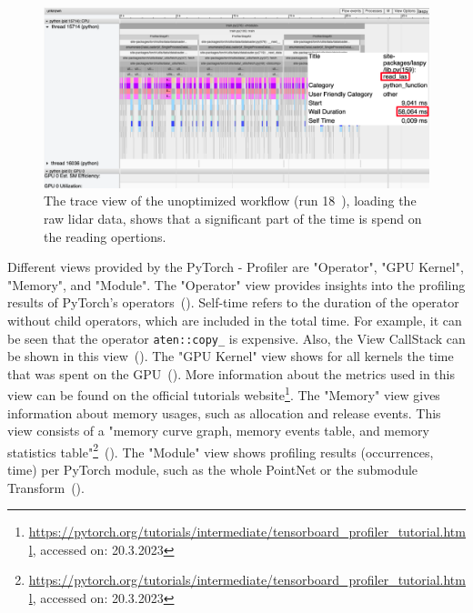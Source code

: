 \documentclass[12pt, a4paper, hidelinks]{article}
\begin{document}
\begin{figure}[H]
\centering
\includegraphics[width=1\textwidth]{./assets/scap_gtx1080_profiler-torch_sample-points_14650750_trace-view-laspy}
\caption[PyTorch - Profiler: Trace View of data input for run 18]{The trace view of the unoptimized workflow (run 18~), loading the raw lidar data, shows that a significant part of the time is spend on the reading opertions.}
\label{fig:scap_gtx1080_profiler-torch_sample-points_14650750_trace-view-laspy}
\end{figure}

Different views provided by the PyTorch - Profiler are "Operator", "GPU Kernel", "Memory", and "Module".
The "Operator" view provides insights into the profiling results of PyTorch's operators~(). Self-time refers to the duration of the operator without child operators, which are included in the total time. For example, it can be seen that the operator \texttt{aten::copy\_} is expensive. Also, the View CallStack can be shown in this view~().
The "GPU Kernel" view shows for all kernels the time that was spent on the \ac{GPU}~(). More information about the metrics used in this view can be found on the official tutorials website\footnote{\url{https://pytorch.org/tutorials/intermediate/tensorboard_profiler_tutorial.html}, accessed on: 20.3.2023}.
The "Memory" view gives information about memory usages, such as allocation and release events. This view consists of a "memory curve graph, memory events table, and memory statistics table"\footnote{\url{https://pytorch.org/tutorials/intermediate/tensorboard_profiler_tutorial.html}, accessed on: 20.3.2023}~().
The "Module" view shows profiling results (occurrences, time) per PyTorch module, such as the whole PointNet or the submodule Transform~().
\end{document}

